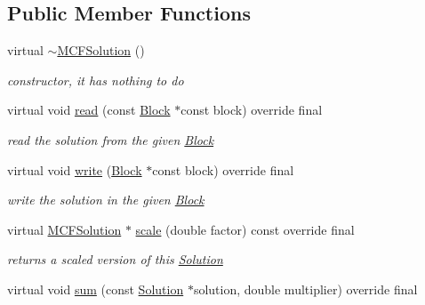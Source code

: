 \subsection*{Public Member Functions}
\begin{DoxyCompactItemize}
\item 
virtual \mbox{\hyperlink{class_s_m_spp__di__unipi__it_1_1_m_c_f_solution_a06cb8183f6fd315bada6c44615d2d72f}{$\sim$\+M\+C\+F\+Solution}} ()
\begin{DoxyCompactList}\small\item\em constructor, it has nothing to do \end{DoxyCompactList}\item 
virtual void \mbox{\hyperlink{class_s_m_spp__di__unipi__it_1_1_m_c_f_solution_a4feeb8f2f46fde71030bd3d8070cd90d}{read}} (const \mbox{\hyperlink{class_s_m_spp__di__unipi__it_1_1_block}{Block}} $\ast$const block) override final
\begin{DoxyCompactList}\small\item\em read the solution from the given \mbox{\hyperlink{class_s_m_spp__di__unipi__it_1_1_block}{Block}} \end{DoxyCompactList}\item 
virtual void \mbox{\hyperlink{class_s_m_spp__di__unipi__it_1_1_m_c_f_solution_ad3aad23f258ee59d0c21f1fa6ecdc6fe}{write}} (\mbox{\hyperlink{class_s_m_spp__di__unipi__it_1_1_block}{Block}} $\ast$const block) override final
\begin{DoxyCompactList}\small\item\em write the solution in the given \mbox{\hyperlink{class_s_m_spp__di__unipi__it_1_1_block}{Block}} \end{DoxyCompactList}\item 
virtual \mbox{\hyperlink{class_s_m_spp__di__unipi__it_1_1_m_c_f_solution}{M\+C\+F\+Solution}} $\ast$ \mbox{\hyperlink{class_s_m_spp__di__unipi__it_1_1_m_c_f_solution_a2c818cbb6d8b22f839a7f7336f6b382b}{scale}} (double factor) const override final
\begin{DoxyCompactList}\small\item\em returns a scaled version of this \mbox{\hyperlink{class_s_m_spp__di__unipi__it_1_1_solution}{Solution}} \end{DoxyCompactList}\item 
virtual void \mbox{\hyperlink{class_s_m_spp__di__unipi__it_1_1_m_c_f_solution_ac91491316467fa9925f2c8e8fc08f4c1}{sum}} (const \mbox{\hyperlink{class_s_m_spp__di__unipi__it_1_1_solution}{Solution}} $\ast$solution, double multiplier) override final

\end{DoxyCompactItemize}
